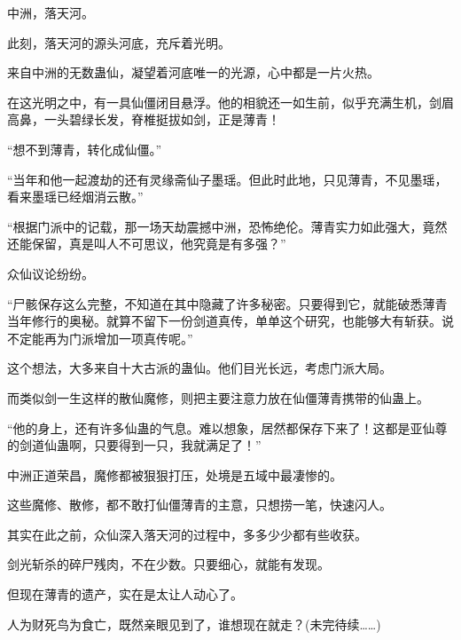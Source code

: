 \begin{this_body}
中洲，落天河。

此刻，落天河的源头河底，充斥着光明。

来自中洲的无数蛊仙，凝望着河底唯一的光源，心中都是一片火热。

在这光明之中，有一具仙僵闭目悬浮。他的相貌还一如生前，似乎充满生机，剑眉高鼻，一头碧绿长发，脊椎挺拔如剑，正是薄青！

“想不到薄青，转化成仙僵。”

“当年和他一起渡劫的还有灵缘斋仙子墨瑶。但此时此地，只见薄青，不见墨瑶，看来墨瑶已经烟消云散。”

“根据门派中的记载，那一场天劫震撼中洲，恐怖绝伦。薄青实力如此强大，竟然还能保留，真是叫人不可思议，他究竟是有多强？”

众仙议论纷纷。

“尸骸保存这么完整，不知道在其中隐藏了许多秘密。只要得到它，就能破悉薄青当年修行的奥秘。就算不留下一份剑道真传，单单这个研究，也能够大有斩获。说不定能再为门派增加一项真传呢。”

这个想法，大多来自十大古派的蛊仙。他们目光长远，考虑门派大局。

而类似剑一生这样的散仙魔修，则把主要注意力放在仙僵薄青携带的仙蛊上。

“他的身上，还有许多仙蛊的气息。难以想象，居然都保存下来了！这都是亚仙尊的剑道仙蛊啊，只要得到一只，我就满足了！”

中洲正道荣昌，魔修都被狠狠打压，处境是五域中最凄惨的。

这些魔修、散修，都不敢打仙僵薄青的主意，只想捞一笔，快速闪人。

其实在此之前，众仙深入落天河的过程中，多多少少都有些收获。

剑光斩杀的碎尸残肉，不在少数。只要细心，就能有发现。

但现在薄青的遗产，实在是太让人动心了。

人为财死鸟为食亡，既然亲眼见到了，谁想现在就走？(未完待续……)

\end{this_body}

